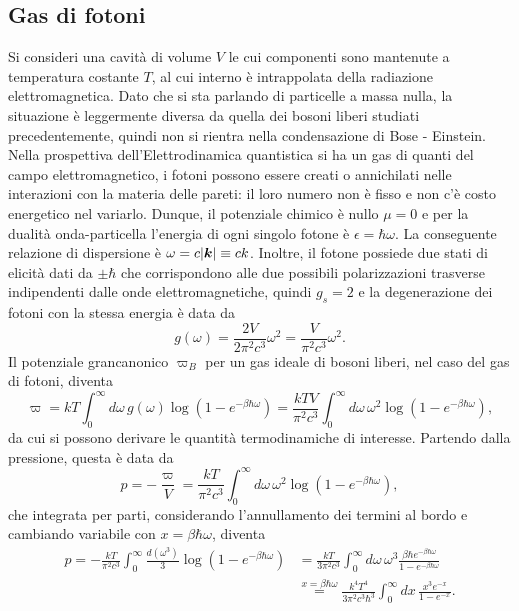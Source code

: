 \subsection{Gas di fotoni}
Si consideri una cavità di volume $V$ le cui componenti sono mantenute a temperatura costante $T$, al cui interno è intrappolata della radiazione elettromagnetica. Dato che si sta parlando di particelle a massa nulla, la situazione è leggermente diversa da quella dei bosoni liberi studiati precedentemente, quindi non si rientra nella condensazione di Bose - Einstein. Nella prospettiva dell'Elettrodinamica quantistica si ha un gas di quanti del campo elettromagnetico, i fotoni possono essere creati o annichilati nelle interazioni con la materia delle pareti: il loro numero non è fisso e non c'è costo energetico nel variarlo. Dunque, il potenziale
chimico è nullo $\mu = 0$ e per la dualità onda-particella l'energia di ogni singolo fotone è $\epsilon = \hbar\omega$. La conseguente relazione di dispersione è $\omega = c|\bm{k}| \equiv ck$. Inoltre, il fotone possiede due stati di elicità dati da $\pm\hbar$ che corrispondono alle due possibili polarizzazioni trasverse indipendenti dalle onde elettromagnetiche, quindi $g_s = 2$ e la degenerazione dei fotoni con la stessa energia è data da
\begin{equation}
    g(\omega) = \frac{2V}{2\pi^2c^3}\omega^2 = \frac{V}{\pi^2c^3}\omega^2.
\end{equation}
Il potenziale grancanonico $\varpi_B$ per un gas ideale di bosoni liberi, nel caso del gas di fotoni, diventa
\begin{equation}
    \varpi = kT\int_0^\infty d\omega\,g(\omega)\log{(1 - e^{-\beta\hbar\omega})} = \frac{kTV}{\pi^2c^3}\int_0^\infty d\omega\,\omega^2\log{(1 - e^{-\beta\hbar\omega})},
\end{equation}
da cui si possono derivare le quantità termodinamiche di interesse. Partendo dalla pressione, questa è data da
\begin{equation}
    p = -\frac{\varpi}{V} = \frac{kT}{\pi^2c^3}\int_0^\infty d\omega\,\omega^2\log{(1 - e^{-\beta\hbar\omega})},
\end{equation}
che integrata per parti, considerando l'annullamento dei termini al bordo e cambiando variabile con $x = \beta\hbar\omega$, diventa
\begin{equation}
    \begin{split}
        p = -\frac{kT}{\pi^2c^3}\int_0^\infty\frac{d(\omega^3)}{3}\log{(1 - e^{-\beta\hbar\omega})} &= \frac{kT}{3\pi^2c^3}\int_0^\infty d\omega\,\omega^3\frac{\beta\hbar e^{-\beta\hbar\omega}}{1 - e^{-\beta\hbar\omega}} \\
        &\overset{x=\beta\hbar\omega}{=} \frac{k^4T^4}{3\pi^2c^3\hbar^3}\int_0^\infty dx\,\frac{x^3e^{-x}}{1 - e^{-x}}.
    \end{split}
\end{equation}
